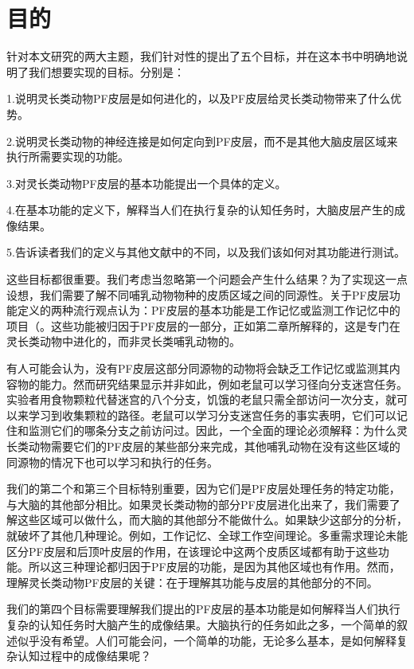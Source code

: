 \section{目的}
针对本文研究的两大主题，我们针对性的提出了五个目标，并在这本书中明确地说明了我们想要实现的目标。分别是：
\par 
  1.说明灵长类动物PF皮层是如何进化的，以及PF皮层给灵长类动物带来了什么优势。 
\par 2.说明灵长类动物的神经连接是如何定向到PF皮层，而不是其他大脑皮层区域来执行所需要实现的功能。 
\par 3.对灵长类动物PF皮层的基本功能提出一个具体的定义。
\par 4.在基本功能的定义下，解释当人们在执行复杂的认知任务时，大脑皮层产生的成像结果。
\par  5.告诉读者我们的定义与其他文献中的不同，以及我们该如何对其功能进行测试。
\par 
这些目标都很重要。我们考虑当忽略第一个问题会产生什么结果？为了实现这一点设想，我们需要了解不同哺乳动物物种的皮质区域之间的同源性。关于PF皮层功能定义的两种流行观点认为：PF皮层的基本功能是工作记忆或监测工作记忆中的项目（。这些功能被归因于PF皮层的一部分，正如第二章所解释的，这是专门在灵长类动物中进化的，而非灵长类哺乳动物的。
\par 
有人可能会认为，没有PF皮层这部分同源物的动物将会缺乏工作记忆或监测其内容物的能力。然而研究结果显示并非如此，例如老鼠可以学习径向分支迷宫任务。实验者用食物颗粒代替迷宫的八个分支，饥饿的老鼠只需全部访问一次分支，就可以来学习到收集颗粒的路径。老鼠可以学习分支迷宫任务的事实表明，它们可以记住和监测它们的哪条分支之前访问过。因此，一个全面的理论必须解释：为什么灵长类动物需要它们的PF皮层的某些部分来完成，其他哺乳动物在没有这些区域的同源物的情况下也可以学习和执行的任务。
\par
我们的第二个和第三个目标特别重要，因为它们是PF皮层处理任务的特定功能，与大脑的其他部分相比。如果灵长类动物的部分PF皮层进化出来了，我们需要了解这些区域可以做什么，而大脑的其他部分不能做什么。如果缺少这部分的分析，就破坏了其他几种理论。例如，工作记忆、全球工作空间理论。多重需求理论未能区分PF皮层和后顶叶皮层的作用，在该理论中这两个皮质区域都有助于这些功能。所以这三种理论都归因于PF皮层的功能，是因为其他区域也有作用。然而，理解灵长类动物PF皮层的关键：在于理解其功能与皮层的其他部分的不同。
\par
我们的第四个目标需要理解我们提出的PF皮层的基本功能是如何解释当人们执行复杂的认知任务时大脑产生的成像结果。大脑执行的任务如此之多，一个简单的叙述似乎没有希望。人们可能会问，一个简单的功能，无论多么基本，是如何解释复杂认知过程中的成像结果呢？
\par
